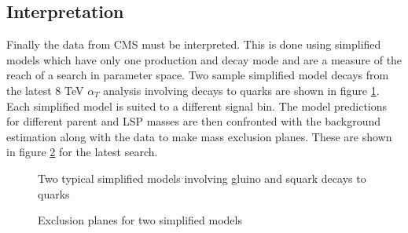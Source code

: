\subsection{Interpretation}
Finally the data from CMS must be interpreted. This is done using simplified models which have only one production and decay mode and are a measure of the reach of a search in parameter space. Two sample simplified model decays from the latest 8 TeV $\alpha_T$ analysis involving decays to quarks are shown in figure \ref{simp}. Each simplified model is suited to a different signal bin. The model predictions for different parent and LSP masses are then confronted with the background estimation along with the data to make mass exclusion planes. These are shown in figure \ref{simp2} for the latest search.
\begin{figure}
\hfill
{}
\hfill
{}
\hfill
\caption{Two typical simplified models involving gluino and squark decays to quarks}
\label{simp}
\end{figure}
\begin{figure}
\hfill
{}
\hfill
{}
\hfill
\caption{Exclusion planes for two simplified models}
\label{simp2}
\end{figure}


